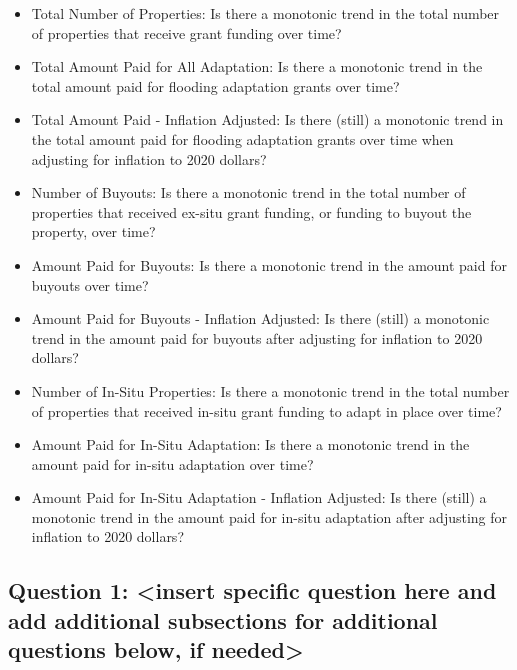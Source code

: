 \documentclass[
  12pt,
]{article}
\begin{document}
\begin{itemize}
\item
  Total Number of Properties: Is there a monotonic trend in the total
  number of properties that receive grant funding over time?\\
\item
  Total Amount Paid for All Adaptation: Is there a monotonic trend in
  the total amount paid for flooding adaptation grants over time?\\
\item
  Total Amount Paid - Inflation Adjusted: Is there (still) a monotonic
  trend in the total amount paid for flooding adaptation grants over
  time when adjusting for inflation to 2020 dollars?
\item
  Number of Buyouts: Is there a monotonic trend in the total number of
  properties that received ex-situ grant funding, or funding to buyout
  the property, over time?\\
\item
  Amount Paid for Buyouts: Is there a monotonic trend in the amount paid
  for buyouts over time?\\
\item
  Amount Paid for Buyouts - Inflation Adjusted: Is there (still) a
  monotonic trend in the amount paid for buyouts after adjusting for
  inflation to 2020 dollars?
\item
  Number of In-Situ Properties: Is there a monotonic trend in the total
  number of properties that received in-situ grant funding to adapt in
  place over time?\\
\item
  Amount Paid for In-Situ Adaptation: Is there a monotonic trend in the
  amount paid for in-situ adaptation over time?\\
\item
  Amount Paid for In-Situ Adaptation - Inflation Adjusted: Is there
  (still) a monotonic trend in the amount paid for in-situ adaptation
  after adjusting for inflation to 2020 dollars?
\end{itemize}

\hypertarget{question-1-insert-specific-question-here-and-add-additional-subsections-for-additional-questions-below-if-needed}{%
\subsection{Question 1: \textless insert specific question here and add
additional subsections for additional questions below, if
needed\textgreater{}}\label{question-1-insert-specific-question-here-and-add-additional-subsections-for-additional-questions-below-if-needed}}
\end{document}
